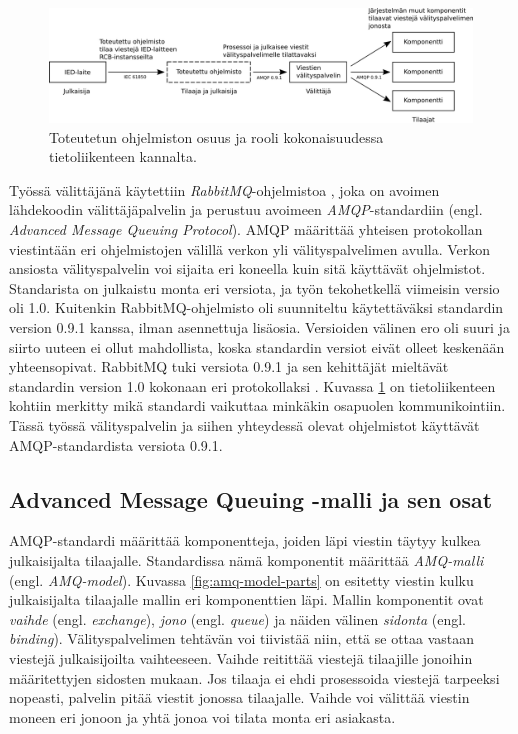 \begin{figure}[ht!]
	\includegraphics[width=1\textwidth]{pictures/implemented-system-communication.png}
	\caption{Toteutetun ohjelmiston osuus ja rooli kokonaisuudessa tietoliikenteen kannalta.}
	\label{fig:implemented-system-communication}
\end{figure}

Työssä välittäjänä käytettiin \emph{RabbitMQ}-ohjelmistoa \cite{rabbitmq-homepage}, joka on avoimen lähdekoodin välittäjäpalvelin ja perustuu avoimeen \emph{AMQP}-standardiin \cite{amqp-homepage} (engl. \emph{Advanced Message Queuing Protocol}). AMQP määrittää yhteisen protokollan viestintään eri ohjelmistojen välillä verkon yli välityspalvelimen avulla. Verkon ansiosta välityspalvelin voi sijaita eri koneella kuin sitä käyttävät ohjelmistot. Standarista on julkaistu monta eri versiota, ja työn tekohetkellä viimeisin versio oli 1.0. Kuitenkin RabbitMQ-ohjelmisto oli suunniteltu käytettäväksi standardin version 0.9.1 kanssa, ilman asennettuja lisäosia. Versioiden välinen ero oli suuri ja siirto uuteen ei ollut mahdollista, koska standardin versiot eivät olleet keskenään yhteensopivat. RabbitMQ tuki versiota 0.9.1 ja sen kehittäjät mieltävät standardin version 1.0 kokonaan eri protokollaksi \mbox{\cite{RabbitMQ-Compatibility-and-Conformance}}. Kuvassa \ref{fig:implemented-system-communication} on tietoliikenteen kohtiin merkitty mikä standardi vaikuttaa minkäkin osapuolen kommunikointiin. Tässä työssä välityspalvelin ja siihen yhteydessä olevat ohjelmistot käyttävät AMQP-standardista versiota 0.9.1.


\subsection{Advanced Message Queuing -malli ja sen osat}
AMQP-standardi määrittää komponentteja, joiden läpi viestin täytyy kulkea julkaisijalta tilaajalle. Standardissa nämä komponentit määrittää \emph{AMQ-malli} (engl. \emph{AMQ-model}). Kuvassa \ref{fig:amq-model-parts} on esitetty viestin kulku julkaisijalta tilaajalle mallin eri komponenttien läpi. Mallin komponentit ovat \emph{vaihde} (engl. \emph{exchange}), \emph{jono} (engl. \emph{queue}) ja näiden välinen \emph{sidonta} (engl. \emph{binding}). Välityspalvelimen tehtävän voi tiivistää niin, että se ottaa vastaan viestejä julkaisijoilta vaihteeseen. Vaihde reitittää viestejä tilaajille jonoihin määritettyjen sidosten mukaan. Jos tilaaja ei ehdi prosessoida viestejä tarpeeksi nopeasti, palvelin pitää viestit jonossa tilaajalle. Vaihde voi välittää viestin moneen eri jonoon ja yhtä jonoa voi tilata monta eri asiakasta.

